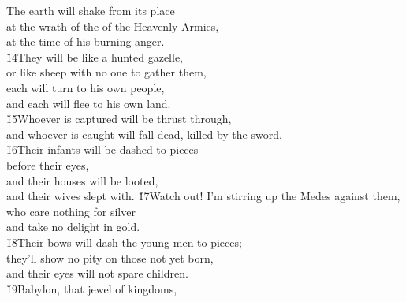 \begin{poetry}
\poemll    The earth will shake from its place \\
\poeml at the wrath of the  of the Heavenly Armies, \\
\poemll    at the time of his burning anger. \\
\poeml \v{14}They will be like a hunted gazelle, \\
\poemll    or like sheep with no one to gather them, \\
\poeml each will turn to his own people, \\
\poemll    and each will flee to his own land. \\
\poeml \v{15}Whoever is captured will be thrust through, \\
\poemll    and whoever is caught will fall dead, killed by the sword. \\
\poeml \v{16}Their infants will be dashed to pieces \\
\poemll    before their eyes, \\
\poeml and their houses will be looted, \\
\poemll    and their wives slept with.
\poeml \v{17}Watch out! I'm stirring up the Medes against them, \\
\poemll    who care nothing for silver \\
\poemlll       and take no delight in gold. \\
\poeml \v{18}Their bows will dash the young men to pieces; \\
\poemll    they'll show no pity on those not yet born, \\
\poemlll       and their eyes will not spare children. \\
\poeml \v{19}Babylon, that jewel of kingdoms, \\

\end{poetry}
